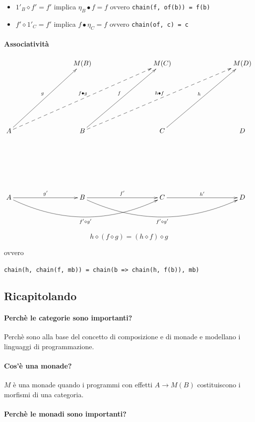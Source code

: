 \documentclass[12pt]{article}
\theoremstyle{definition}
\begin{document}
\begin{itemize}
  \item $1'_B \diamond f' = f'$ implica $\eta_B \bullet f = f$ ovvero \texttt{chain(f, of(b)) = f(b)}
  \item $f' \diamond 1'_C = f'$ implica $f \bullet \eta_C = f$ ovvero \texttt{chain(of, c) = c}
\end{itemize}

\paragraph{Associatività}

\[
\xymatrixrowsep{3cm}
\xymatrixcolsep{3cm}
\xymatrix{
  & M(B) & M(C) & M(D) \\
  A \ar[ur]^g \ar@{-->}[urr]^{f \bullet g} & B \ar[ur]^f \ar@{-->}[urr]^{h \bullet f} & C \ar[ur]^h & D \\
  A \ar[r]^{g'} \ar@/_1cm/[rr]_{f' \diamond g'} & B \ar[r]^{f'} \ar@/_1cm/[rr]_{f' \diamond g'} & C \ar[r]^{h'} & D
}
\]

$$
h \diamond (f \diamond g) = (h \diamond f) \diamond g
$$

ovvero

\begin{center}
\texttt{chain(h, chain(f, mb)) = chain(b => chain(h, f(b)), mb)}
\end{center}

\subsection{Ricapitolando}

\paragraph{Perchè le categorie sono importanti?}

Perchè sono alla base del concetto di composizione e di monade e modellano i linguaggi di programmazione.

\paragraph{Cos'è una monade?}

$M$ è una monade quando i programmi con effetti $A \rightarrow M(B)$ costituiscono i morfismi di una categoria.

\paragraph{Perchè le monadi sono importanti?}
\end{document}
